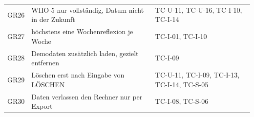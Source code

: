 \begin{longtable}{@{}L{1.5cm}L{9.3cm}L{5.3cm}@{}}
  GR26 & WHO-5 nur vollständig, Datum nicht in der Zukunft & TC-U-11, TC-U-16, TC-I-10, TC-I-14 \\
  GR27 & höchstens eine Wochenreflexion je Woche & TC-I-01, TC-I-10 \\
  GR28 & Demodaten zusätzlich laden, gezielt entfernen & TC-I-09 \\
  GR29 & Löschen erst nach Eingabe von LÖSCHEN & TC-U-11, TC-I-09, TC-I-13, TC-I-14, TC-S-05 \\
  GR30 & Daten verlassen den Rechner nur per Export & TC-I-08, TC-S-06 \\
\end{longtable}
